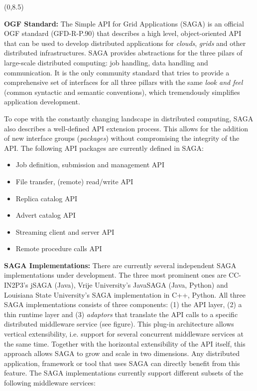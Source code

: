 \documentclass[a0b,portrait]{a0poster}
\def\LHead#1{\bigskip\bigskip\noindent{\huge\color{HeadColor} #1}\smallskip}
\begin{document}
\begin{textblock}{7}(0,8.5)

\LHead{What is SAGA ?}
\large

\textbf{\color{DarkBlue} OGF Standard: } The Simple API for Grid Applications
(SAGA) is an official OGF standard (GFD-R-P.90) that describes a high level,
object-oriented API that can be used to develop distributed applications for
\textit{clouds}, \textit{grids} and other distributed infrastructures.  SAGA
provides abstractions for the three pilars of large-scale distributed
computing: job handling, data handling and communication. It is the only
community standard that tries to provide a comprehensive set of interfaces for
all three pillars with the same \textit{look and feel} (common syntactic and
semantic conventions), which tremendously simplifies application development.

To cope with the constantly changing landscape in distributed computing, SAGA
also describes a well-defined API extension process. This allows for the
addition of new interface groups (\textit{packages}) without compromising the
integrity of the API. The following API packages are currently defined in
SAGA:

\begin{itemize} 
\item{Job definition, submission and management API}
\item{File transfer, (remote) read/write API} 
\item{Replica catalog API}
\item{Advert catalog API} 
\item{Streaming client and server API} 
\item{Remote procedure calls API} 
\end{itemize}

\textbf{\color{DarkBlue} SAGA Implementations: } There are currently several
independent SAGA implementations under development. The three most prominent
ones are CC-IN2P3's jSAGA (Java), Vrije University's JavaSAGA (Java, Python)
and Louisiana State University's SAGA implementation in C++, Python. All three
SAGA implementations consists of three components: (1) the API layer, (2) a
thin runtime layer and (3) \textit{adaptors} that translate the API calls to a
specific distributed middleware service (see figure). This plug-in
architecture allows vertical extensibility, i.e. support for several
concurrent middleware services at the same time. Together with the horizontal
extensibility of the API itself, this approach allows SAGA to grow and scale
in two dimensions. Any distributed application, framework or tool that uses
SAGA can directly benefit from this feature. The SAGA implementations 
currently support different subsets of the following middleware services:


\end{textblock}
\end{document}
